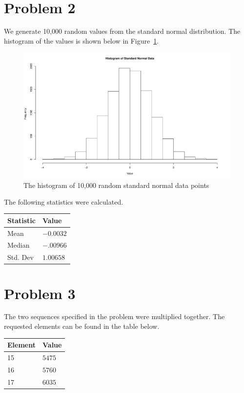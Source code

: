 \documentclass{amsart}
\begin{document}
\section{Problem 2}
We generate 10,000 random values from the standard normal
distribution. The histogram of the values is shown below in Figure~\ref{fig:p2a}.
\begin{figure}[H]
  \centering
  \includegraphics[width=\linewidth]{problem2_histogram.pdf}
  \caption{The histogram of 10,000 random standard normal data points}
  \label{fig:p2a}
\end{figure}

The following statistics were calculated.
\begin{table}[H]
\centering
\begin{tabular}{ll}
  \hline
Statistic & Value \\
  \hline
Mean & $-0.0032$ \\
Median & $-.00966$ \\
Std. Dev & $1.00658$ \\
   \hline
\end{tabular}
\end{table}

\section{Problem 3}
The two sequences specified in the problem were multiplied together.
The requested elements can be found in the table below.

\begin{table}[H]
\centering
\begin{tabular}{ll}
  \hline
Element & Value \\
  \hline
15 & $5475$ \\
16 & $5760$ \\
17 & $6035$ \\
   \hline
\end{tabular}
\end{table}
\end{document}
